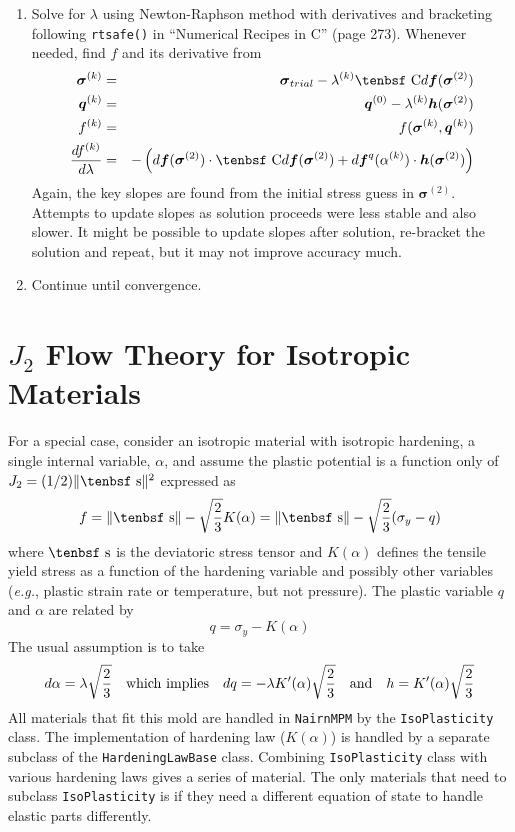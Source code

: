 \documentclass[11pt]{book}
\renewcommand{\vec}[1]{\boldsymbol{#1}}
\def\C{\hbox{\tenbsf C}}
\def\dev{\hbox{\tenbsf s}}
\def\df{d \vec{f}}
\def\dfq{d \vec{f}^q}
\begin{document}
\begin{enumerate}
\item Solve for $\lambda$ using Newton-Raphson method with derivatives and bracketing following {\tt rtsafe()} in ``Numerical Recipes in C'' (page 273). Whenever needed, find $f$ and its derivative from
\begin{eqnarray}
      {\vec\sigma}^{(k)} & = & {\vec\sigma_{trial}} - \lambda^{(k)}\C\df({\vec\sigma}^{(2)}) \\
      \vec q^{(k)} & = & \vec q^{(0)} - \lambda^{(k)} \vec h({\vec\sigma}^{(2)}) \\
      f^{(k)} & = &  f({\vec\sigma}^{(k)},\vec q^{(k)})  \\
      {df^{(k)}\over d\lambda} & = & -\left( \df({\vec\sigma}^{(2)})\cdot \C\df({\vec\sigma}^{(2)}) + \dfq(\alpha^{(k)}) \cdot \vec h({\vec\sigma}^{(2)})\right) 
\end{eqnarray}
Again, the key slopes are found from the initial stress guess in ${\vec\sigma}^{(2)}$. Attempts to update slopes as solution proceeds were less stable and also slower. It might be possible to update slopes after solution, re-bracket the solution and repeat, but it may not improve accuracy much.

\item Continue until convergence.

\end{enumerate}

\section{$J_2$ Flow Theory for Isotropic Materials\label{J2ISO}}

For a special case, consider an isotropic material with isotropic hardening, a single internal variable, $\alpha$, and assume the plastic potential is a function only of $J_2= (1/2)\|\dev\|^2$ expressed as
\begin{equation}
      f = \|\dev\| - \sqrt{2\over3} K(\alpha) = \|\dev\| - \sqrt{2\over3}(\sigma_y - q)
\end{equation}
where $\dev$ is the deviatoric stress tensor and $K(\alpha)$ defines the tensile yield stress as a function of the hardening variable and possibly other variables ({\it e.g.}, plastic strain rate or temperature, but not pressure). The plastic variable $q$ and $\alpha$ are related by
\begin{equation}
      q  = \sigma_y - K(\alpha)
\end{equation}
The usual assumption is to take
\begin{equation}
        d\alpha = \lambda\sqrt{2\over3}  \quad{\rm which\ implies} 
        \quad dq = -\lambda K'(\alpha)\sqrt{2\over3}  \quad{\rm and} 
        \quad h = K'(\alpha)\sqrt{2\over3}
\end{equation}
All materials that fit this mold are handled in {\tt NairnMPM} by the {\tt IsoPlasticity} class. The implementation of hardening law ($K(\alpha)$) is handled by a separate subclass of the {\tt HardeningLawBase} class. Combining {\tt IsoPlasticity} class with various hardening laws gives a series of material. The only materials that need to subclass {\tt IsoPlasticity} is if they need a different equation of state to handle elastic parts differently.
\end{document}
